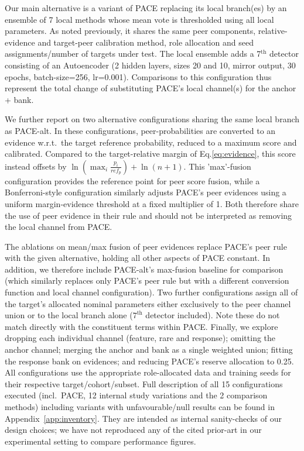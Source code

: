 Our main alternative is a variant of PACE replacing its local branch(es) by an ensemble of 7 local methods whose mean vote is thresholded using all local parameters. As noted previously, it shares the same peer components, relative-evidence and target-peer calibration method, role allocation and seed assignments/number of targets under test. The local ensemble adds a 7$^{\text{th}}$ detector consisting of an Autoencoder (2 hidden layers, sizes 20 and 10, mirror output, 30 epochs, batch-size=256, lr=0.001). Comparisons to this configuration thus represent the total change of substituting PACE's local channel(s) for the anchor + bank.

We further report on two alternative configurations sharing the same local branch as PACE-alt. In these configurations, peer-probabilities are converted to an evidence w.r.t.\ the target reference probability, reduced to a maximum score and calibrated. Compared to the target-relative margin of Eq.\ref{eq:evidence}, this score instead offsets by $\ln(\max_{i}\frac{p_i}{ref_p}) + \ln(n+1)$. This 'max'-fusion configuration provides the reference point for peer score fusion, while a Bonferroni-style configuration similarly adjusts PACE's peer evidences using a uniform margin-evidence threshold at a fixed multiplier of 1. Both therefore share the use of peer evidence in their rule and should not be interpreted as removing the local channel from PACE.

The ablations on mean/max fusion of peer evidences replace PACE's peer rule with the given alternative, holding all other aspects of PACE constant. In addition, we therefore include PACE-alt's max-fusion baseline for comparison (which similarly replaces only PACE's peer rule but with a different conversion function and local channel configuration). Two further configurations assign all of the target's allocated nominal parameters either exclusively to the peer channel union or to the local branch alone ($7^{\text{th}}$ detector included). Note these do not match directly with the constituent terms within PACE. Finally, we explore dropping each individual channel (feature, rare and response); omitting the anchor channel; merging the anchor and bank as a single weighted union; fitting the response bank on evidences; and reducing PACE's reserve allocation to 0.25. All configurations use the appropriate role-allocated data and training seeds for their respective target/cohort/subset. Full description of all 15 configurations executed (incl.\ PACE, 12 internal study variations and the 2 comparison methods) including variants with unfavourable/null results can be found in Appendix~\ref{app:inventory}. They are intended as internal sanity-checks of our design choices; we have not reproduced any of the cited prior-art in our experimental setting to compare performance figures.

